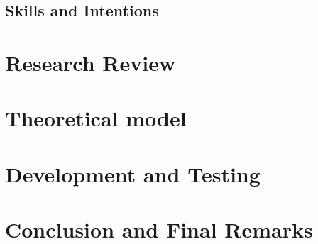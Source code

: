 \documentclass[a4paper,11pt]{article}
\begin{document}
\begin{multicols}{2}
\subsection{Skills and Intentions}

\section{Research Review}
\section{Theoretical model}
\section{Development and Testing}
\section{Conclusion and Final Remarks}

\newpage
\nocite{*}


\end{multicols}
\end{document}
